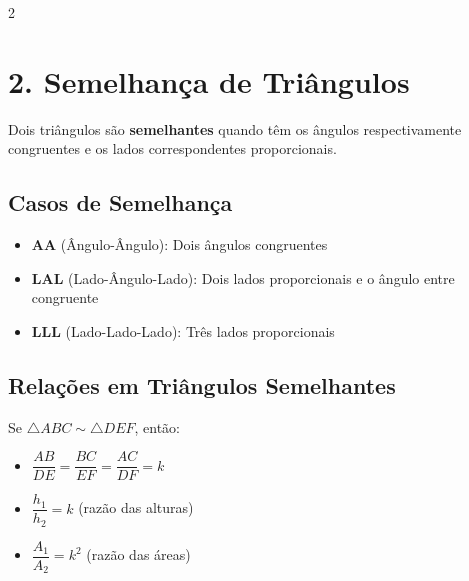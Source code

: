 \documentclass[11pt]{article}
\begin{document}
\begin{multicols}{2}
\section*{2. Semelhança de Triângulos}

Dois triângulos são \textbf{semelhantes} quando têm os ângulos respectivamente congruentes e os lados correspondentes proporcionais.

\subsection*{Casos de Semelhança}
\begin{itemize}
    \item \textbf{AA} (Ângulo-Ângulo): Dois ângulos congruentes
    \item \textbf{LAL} (Lado-Ângulo-Lado): Dois lados proporcionais e o ângulo entre congruente
    \item \textbf{LLL} (Lado-Lado-Lado): Três lados proporcionais
\end{itemize}

\begin{center}
\end{center}

\subsection*{Relações em Triângulos Semelhantes}
Se $\triangle ABC \sim \triangle DEF$, então:
\begin{itemize}
    \item $\dfrac{AB}{DE} = \dfrac{BC}{EF} = \dfrac{AC}{DF} = k$
    \item $\dfrac{h_1}{h_2} = k$ (razão das alturas)
    \item $\dfrac{A_1}{A_2} = k^2$ (razão das áreas)
\end{itemize}


\end{multicols}
\end{document}
